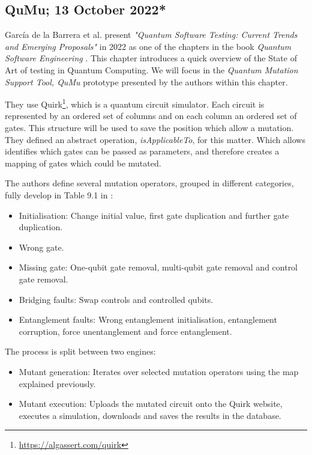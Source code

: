 \begin{itemize}
\vspace{15pt}
\subsection{QuMu; 13 October 2022*}

García de la Barrera et al. present \textit{"Quantum Software Testing: Current Trends and Emerging Proposals"} \cite{de2022quantum} in 2022 as one of the chapters in the book \textit{Quantum Software Engineering} \cite{serrano2022quantum}. This chapter introduces a quick overview of the State of Art of testing in Quantum Computing. We will focus in the \textit{Quantum Mutation Support Tool, QuMu} prototype presented by the authors within this chapter.\newline

They use Quirk\footnote{\url{https://algassert.com/quirk}}, which is a quantum circuit simulator. Each circuit is represented by an ordered set of columns and on each column an ordered set of gates. This structure will be used to save the position which allow a mutation. They defined an abstract operation, \textit{isApplicableTo}, for this matter. Which allows identifies which gates can be passed as parameters, and therefore creates a mapping of gates which could be mutated.\newline

The authors define several mutation operators, grouped in different categories, fully develop in Table 9.1 in \cite{de2022quantum}:

\begin{itemize}
    \item Initialisation: Change initial value, first gate duplication and further gate duplication.
    \item Wrong gate.
    \item Missing gate: One-qubit gate removal, multi-qubit gate removal and control gate removal.
    \item Bridging faults: Swap controls and controlled qubits.
    \item Entanglement faults: Wrong entanglement initialisation, entanglement corruption, force unentanglement and force entanglement.
\end{itemize}

The process is split between two engines:
\begin{itemize}
    \item Mutant generation: Iterates over selected mutation operators using the map explained previously.
    \item Mutant execution: Uploads the mutated circuit onto the Quirk website, executes a simulation, downloads and saves the results in the database.
\end{itemize}


\end{itemize}
